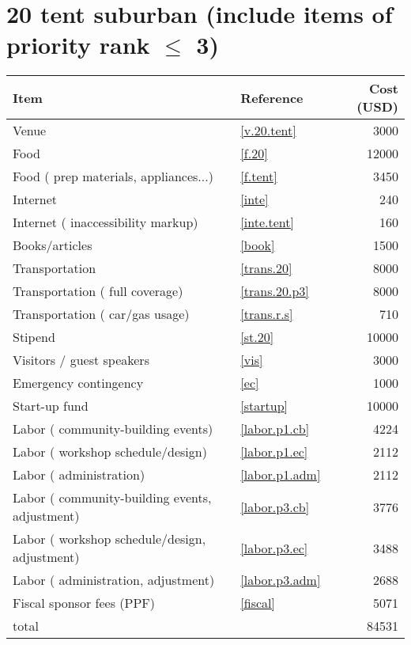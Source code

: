 \section*{20 tent suburban (include items of priority rank $\leq$ 3)}
\begin{center}
\begin{tabular}{llr}
Item & Reference & Cost (USD) \\ \hline
Venue & \ref{v.20.tent} & 3000 \\
Food & \ref{f.20} & 12000 \\
Food ( prep materials, appliances...) & \ref{f.tent} & 3450 \\
Internet & \ref{inte} & 240 \\
Internet ( inaccessibility markup) & \ref{inte.tent} & 160 \\
Books/articles & \ref{book} & 1500 \\
Transportation & \ref{trans.20} & 8000 \\
Transportation ( full coverage) & \ref{trans.20.p3} & 8000 \\
Transportation ( car/gas usage) & \ref{trans.r.s} & 710 \\
Stipend & \ref{st.20} & 10000 \\
Visitors / guest speakers & \ref{vis} & 3000 \\
Emergency contingency & \ref{ec} & 1000 \\
Start-up fund & \ref{startup} & 10000 \\
Labor ( community-building events) & \ref{labor.p1.cb} & 4224 \\
Labor ( workshop schedule/design) & \ref{labor.p1.ec} & 2112 \\
Labor ( administration) & \ref{labor.p1.adm} & 2112 \\
Labor ( community-building events, adjustment) & \ref{labor.p3.cb} & 3776 \\
Labor ( workshop schedule/design, adjustment) & \ref{labor.p3.ec} & 3488 \\
Labor ( administration, adjustment) & \ref{labor.p3.adm} & 2688 \\
Fiscal sponsor fees (PPF) & \ref{fiscal} & 5071 \\ \hline
total &  & 84531
\end{tabular}
\end{center}
\newpage
